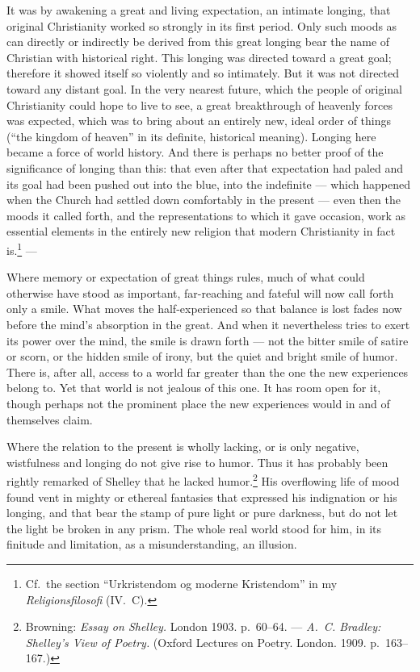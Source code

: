 \documentclass[12pt]{book}
\newcommand{\opage}[1]{\marginnote{\footnotesize\textit{[#1]}}}
\begin{document}
It was by awakening a great and living expectation, an intimate longing, that original
Christianity worked so strongly in its first period. Only such moods as can directly or
indirectly be derived from this great longing bear the name of Christian with
historical right. This longing was directed toward a great goal; therefore it showed
itself so violently and so intimately. But it was not directed toward any distant
goal. In the very nearest future, which the people of original Christianity could hope
to live to see, a great breakthrough of heavenly forces was expected, which was to
bring about an entirely new, ideal order of things (``the kingdom of heaven'' in its
definite, historical meaning). Longing here became a force of world history. And there
is perhaps no better proof of the significance of longing than this: that even after
that expectation had paled and its goal had been pushed out into the blue, into the
indefinite --- which happened when the Church had settled down comfortably in the
present --- even then the moods \opage{82}it called forth, and the representations to
which it gave occasion, work as essential elements in the entirely new religion that
modern Christianity in fact is.\footnote{Cf.\ the section ``Urkristendom og moderne
Kristendom'' in my \textit{Religionsfilosofi} (IV.~C).} ---

Where memory or expectation of great things rules, much of what could otherwise have
stood as important, far-reaching and fateful will now call forth only a smile. What
moves the half-experienced so that balance is lost fades now before the mind's
absorption in the great. And when it nevertheless tries to exert its power over the
mind, the smile is drawn forth --- not the bitter smile of satire or scorn, or the
hidden smile of irony, but the quiet and bright smile of humor. There is, after all,
access to a world far greater than the one the new experiences belong to. Yet that
world is not jealous of this one. It has room open for it, though perhaps not the
prominent place the new experiences would in and of themselves claim.

Where the relation to the present is wholly lacking, or is only negative, wistfulness
and longing do not give rise to humor. Thus it has probably been rightly remarked of
Shelley that he lacked humor.\footnote{Browning: \textit{Essay on Shelley.} London
1903. p.~60--64. --- \textit{A.~C. Bradley: Shelley's View of Poetry.} (Oxford
Lectures on Poetry. London. 1909. p.~163--167.)} His overflowing life of mood found
vent in mighty or ethereal fantasies that expressed his indignation or his longing, and
that bear the stamp of pure light or pure darkness, but do not let the light be broken
in any prism. The whole real world stood for him, in its finitude and limitation, as a
misunderstanding, an illusion.
\end{document}
